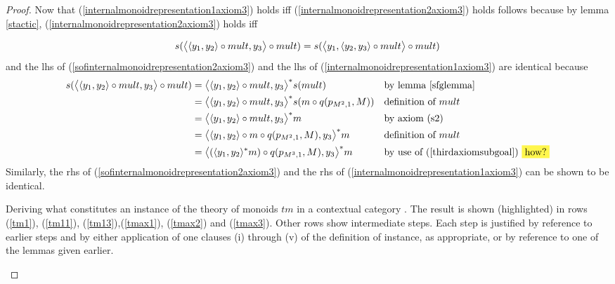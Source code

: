 \begin{proof}
Now that (\ref{internalmonoidrepresentation1axiom3}) holds iff (\ref{internalmonoidrepresentation2axiom3}) holds
follows because by lemma \ref{stactic}, (\ref{internalmonoidrepresentation2axiom3}) holds iff

\begin{equation}
\label{sofinternalmonoidrepresentation2axiom3}
s(\big \langle \langle y_1,y_2\rangle\circ mult,y_3 \big \rangle\circ mult)
=s(\big \langle y_1,\langle y_2,y_3\rangle \circ mult \big \rangle\circ mult)
\end{equation}
and the lhs of (\ref{sofinternalmonoidrepresentation2axiom3}) and the lhs of (\ref{internalmonoidrepresentation1axiom3}) 
are identical because
\begin{align*}
s(\bigtuple{\tuple{y_1,y_2}\circ mult,y_3}\circ mult) 
    &= \bigtuple{\tuple{y_1,y_2}\circ mult,y_3} ^* s(mult) && \mbox{by lemma \ref{sfglemma}} \\
		&= \bigtuple{\tuple{y_1,y_2}\circ mult,y_3} ^* s(\fmult \circ q(p_{\doubleM,1} , M)) && \mbox{definition of $mult$} \\
		&= \bigtuple{\tuple{y_1,y_2}\circ mult,y_3} ^* \fmult                                &&  \mbox{by axiom (s2)} \\
		&= \bigtuple{\tuple{y_1,y_2}\circ \fmult \circ q(p_{\doubleM,1} , M),y_3} ^* \fmult  
		                                                                    &&  \mbox{definition of $mult$} \\	
	  &= \bigtuple{(\tuple{y_1,y_2}^*\fmult)\circ q(p_{M^3,1},M),y_3} ^* \fmult 
		                                                                    &&  \mbox{by use of (\ref{thirdaxiomsubgoal}) \highlight{how?}}
\end{align*}
Similarly, the rhs of (\ref{sofinternalmonoidrepresentation2axiom3}) and the rhs of (\ref{internalmonoidrepresentation1axiom3}) 
can be shown to be identical.

\begin{table}[H]
\caption{Deriving what constitutes an instance of the theory of monoids $tm$ in a contextual category \catc.
The result is shown (highlighted) in rows (\ref{tm1}), (\ref{tm11}), (\ref{tm13}),(\ref{tmax1}), (\ref{tmax2}) and (\ref{tmax3}). Other rows 
show intermediate steps. Each step is justified by reference to earlier steps and by either application of one clauses (i) through (v) of the definition of instance, as appropriate, or by reference to one of the lemmas given earlier.}
\label{internalmonoidtable}


\end{table}
\end{proof}
